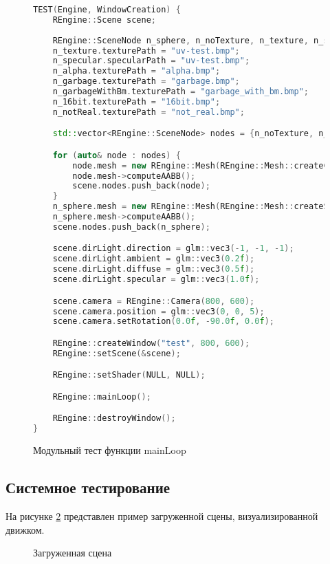 \begin{figure}[ht]
\begin{lstlisting}[language=C++]
TEST(Engine, WindowCreation) {
    REngine::Scene scene;
    
    REngine::SceneNode n_sphere, n_noTexture, n_texture, n_specular, n_alpha, n_garbage, n_garbageWithBm, n_16bit, n_notReal;
    n_texture.texturePath = "uv-test.bmp";
    n_specular.specularPath = "uv-test.bmp";
    n_alpha.texturePath = "alpha.bmp";
    n_garbage.texturePath = "garbage.bmp";
    n_garbageWithBm.texturePath = "garbage_with_bm.bmp";
    n_16bit.texturePath = "16bit.bmp";
    n_notReal.texturePath = "not_real.bmp";

    std::vector<REngine::SceneNode> nodes = {n_noTexture, n_texture, n_specular, n_alpha, n_garbage, n_garbageWithBm, n_16bit, n_notReal};

    for (auto& node : nodes) {
        node.mesh = new REngine::Mesh(REngine::Mesh::createCube());
        node.mesh->computeAABB();
        scene.nodes.push_back(node);
    }
    n_sphere.mesh = new REngine::Mesh(REngine::Mesh::createSphere());
    n_sphere.mesh->computeAABB();
    scene.nodes.push_back(n_sphere);

    scene.dirLight.direction = glm::vec3(-1, -1, -1);
    scene.dirLight.ambient = glm::vec3(0.2f);
    scene.dirLight.diffuse = glm::vec3(0.5f);
    scene.dirLight.specular = glm::vec3(1.0f);

    scene.camera = REngine::Camera(800, 600);
    scene.camera.position = glm::vec3(0, 0, 5);
    scene.camera.setRotation(0.0f, -90.0f, 0.0f);

    REngine::createWindow("test", 800, 600);
    REngine::setScene(&scene);

    REngine::setShader(NULL, NULL);

    REngine::mainLoop();

    REngine::destroyWindow();
}
\end{lstlisting}  
\caption{Модульный тест функции mainLoop}
\label{unitMainLoop:image}
\end{figure}
\clearpage

\subsection{Системное тестирование}

На рисунке \ref{scene:image} представлен пример загруженной сцены, визуализированной движком.
\begin{figure}[H] %
\caption{Загруженная сцена}
\label{scene:image}
\end{figure}

